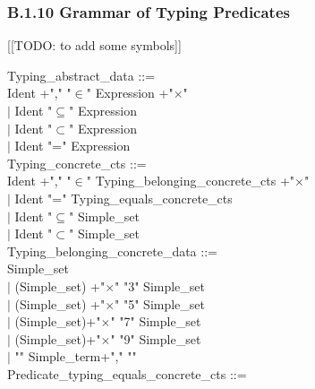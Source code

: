 \documentclass[12pt,a4paper,draft]{article}
\begin{document}
\subsubsection{B.1.10 Grammar of Typing Predicates} 
[[TODO: to add some symbols]]
\footnotesize{
\begin{sloppypar} 


Typing\_abstract\_data ::= \\ 
\hspace*{0.20in}  Ident +","  "$\in$"  Expression +"$\times$"\\ 
\hspace*{0.20in} $|$ Ident  "$\subseteq$"  Expression\\ 
\hspace*{0.20in} $|$ Ident  "$\subset$"  Expression\\ 
\hspace*{0.20in} $|$ Ident  "="  Expression \\ 
Typing\_concrete\_cts ::= \\ 
\hspace*{0.20in}   Ident +","   "$\in$"  Typing\_belonging\_concrete\_cts +"$\times$"\\
\hspace*{0.20in} $|$ Ident  "="  Typing\_equals\_concrete\_cts  \\ 
\hspace*{0.20in} $|$ Ident  "$\subseteq$"  Simple\_set  \\ 
\hspace*{0.20in} $|$ Ident  "$\subset$"  Simple\_set\\ 
Typing\_belonging\_concrete\_data ::= \\ 
\hspace*{0.20in}   Simple\_set \\
\hspace*{0.20in} $|$ (Simple\_set) +"$\times$"  "3"  Simple\_set  \\ 
\hspace*{0.20in} $|$ (Simple\_set) +"$\times$"  "5"  Simple\_set  \\ 
\hspace*{0.20in} $|$ (Simple\_set)+"$\times$"  "7"  Simple\_set  \\ 
\hspace*{0.20in} $|$ (Simple\_set)+"$\times$"  "9"  Simple\_set  \\ 
\hspace*{0.20in} $|$ "{" Simple\_term+","   "}" \\ 
Predicate\_typing\_equals\_concrete\_cts ::= \\ 

\end{sloppypar}}
\end{document}
